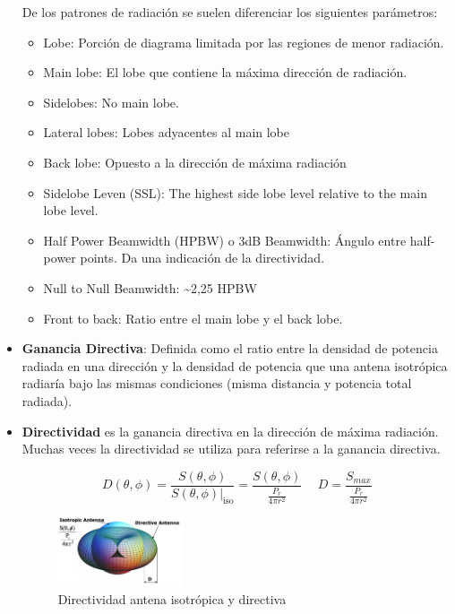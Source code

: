 \documentclass[10pt,portrait, twocolumn]{article}
\begin{document}
\begin{itemize}
		De los patrones de radiación se suelen diferenciar los siguientes parámetros:
		
			\begin{itemize}
			\item Lobe: Porción de diagrama limitada por las regiones de menor radiación.
			\item Main lobe: El lobe que contiene la máxima dirección de radiación.
			\item Sidelobes: No main lobe.
			\item Lateral lobes: Lobes adyacentes al main lobe
			\item Back lobe: Opuesto a la dirección de máxima radiación
			\item Sidelobe Leven (SSL): The highest side lobe level relative to the main lobe level.
			\item Half Power Beamwidth (HPBW) o 3dB Beamwidth: Ángulo entre half-power points. Da una indicación de la directividad.
			\item Null to Null Beamwidth: \textasciitilde 2,25 HPBW
			\item Front to back: Ratio entre el main lobe y el back lobe.
			\end{itemize}
			
		\item \textbf{Ganancia Directiva}: Definida como el ratio entre la densidad de potencia radiada en una dirección y la densidad de potencia que una antena isotrópica radiaría bajo las mismas condiciones (misma distancia y potencia total radiada).
		
		\item \textbf{Directividad} es la ganancia directiva en la dirección de máxima radiación. Muchas veces la directividad se utiliza para referirse a la ganancia directiva.
		
		\begin{equation*}
			D(\theta, \phi) = \frac{S(\theta, \phi)}{S(\theta, \phi) |_{\text{iso}}} = \frac{S(\theta, \phi)}{\frac{P_{r}}{4 \pi r^{2}}} \hspace{15pt} D = \frac{S_{max}}{\frac{P_{r}}{4 \pi r^{2}}}
		\end{equation*}
		
		\begin{figure}[h]
		\centering
	    	\includegraphics[width = 0.35\textwidth]{images/Directiva}
		\caption{Directividad antena isotrópica y directiva}
		\end{figure}
		

\end{itemize}
\end{document}
